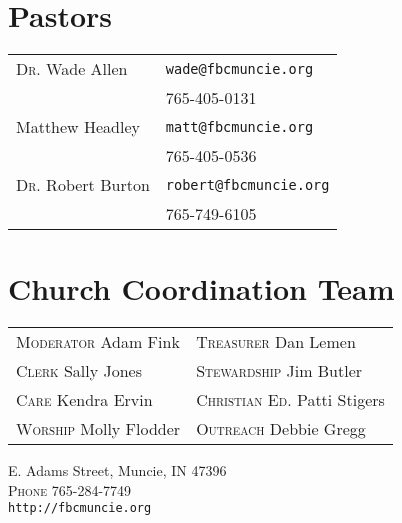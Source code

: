 \vfill

\section{Pastors}
\begin{tabular}{@{}ll}
\textsc{Dr.} Wade Allen & \verb|wade@fbcmuncie.org|\\ 
 & 765-405-0131\\
Matthew Headley & \verb|matt@fbcmuncie.org|\\ 
 & 765-405-0536\\
\textsc{Dr.} Robert Burton & \verb|robert@fbcmuncie.org|\\
 & 765-749-6105\\
\end{tabular}
\section{Church Coordination Team}
\begin{tabular}{@{}ll}
\textsc{Moderator} Adam Fink & \textsc{Treasurer} Dan Lemen\\
\textsc{Clerk} Sally Jones & \textsc{Stewardship} Jim Butler\\
\textsc{Care} Kendra Ervin & \textsc{Christian Ed.} Patti Stigers\\
\textsc{Worship} Molly Flodder & \textsc{Outreach} Debbie Gregg\\
\end{tabular}

\medskip

 E. Adams Street, Muncie, IN 47396\\
\textsc{Phone} 765-284-7749\\
\texttt{http://fbcmuncie.org}

\loggingall

\endinput